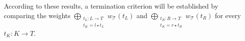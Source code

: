 According to these results, a termination criterion will be established by comparing the weights 
$\mathop{\bigoplus}_{\substack{t_L: L \mathop{\rightarrow} T\\ t_K \mathop{=} l \mathop{\star} t_L}}
        w_\mathcal{T}(t_L)$ and 
$\mathop{\bigoplus}_{\substack{t_R: R \mathop{\rightarrow} T\\ t_K \mathop{=} r \mathop{\star} t_R}} 
        w_\mathcal{T}(t_R)$ for every $t_K: K \mathop{\rightarrow} T$.
















